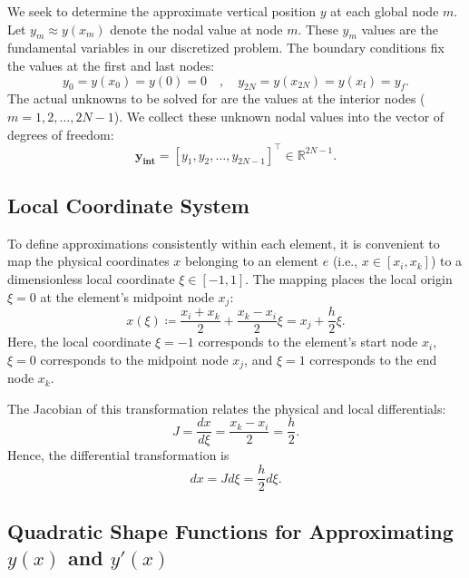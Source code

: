 \documentclass[11pt]{article}
\begin{document}
    We seek to determine the approximate vertical position \( y \) at each global node \(m\). Let \( y_m \approx y(x_m) \) denote the nodal value at node \(m\). These \( y_m \) values are the fundamental variables in our discretized problem. The boundary conditions fix the values at the first and last nodes:
    \[ y_{0} = y(x_{0}) = y(0) = 0 \quad , \quad y_{2N} = y(x_{2N}) = y(x_{\mathrm{f}}) = y_f. \]
    The actual unknowns to be solved for are the values at the interior nodes ($m = 1, 2, \ldots, 2N-1$). We collect these unknown nodal values into the vector of degrees of freedom:
    \begin{equation}
    \mathbf{y_\text{int}} = \left[ y_1, y_2, \ldots, y_{2N-1} \right]^\top \in \mathbb{R}^{2N-1}.
    \label{eq:yint}
    \end{equation}

\subsection{Local Coordinate System}
    
    To define approximations consistently within each element, it is convenient to map the physical coordinates \( x \) belonging to an element \(e\) (i.e., \(x \in [x_i, x_k]\)) to a dimensionless local coordinate \( \xi \in \left[-1,1\right] \). The mapping places the local origin \( \xi = 0 \) at the element's midpoint node \( x_j \):
    \begin{equation}
        x(\xi) \coloneqq \frac{x_{i} + x_k}{2} + \frac{x_k - x_{i}}{2} \xi =  x_j + \frac{h}{2} \xi. \label{eq:x(xi)}
    \end{equation}
    Here, the local coordinate \( \xi = -1 \) corresponds to the element's start node \( x_{i} \), \( \xi = 0 \) corresponds to the midpoint node \( x_j \), and \( \xi = 1 \) corresponds to the end node \( x_k \).
    
    The Jacobian of this transformation relates the physical and local differentials:
    \[ J = \frac{dx}{d\xi} = \frac{x_k - x_i}{2} = \frac{h}{2}. \]
    Hence, the differential transformation is
    \[
        dx = J d\xi = \frac{h}{2} d\xi.
    \]

   
\subsection{Quadratic Shape Functions for Approximating \( y(x) \) and \( y'(x) \) }
    
\end{document}
